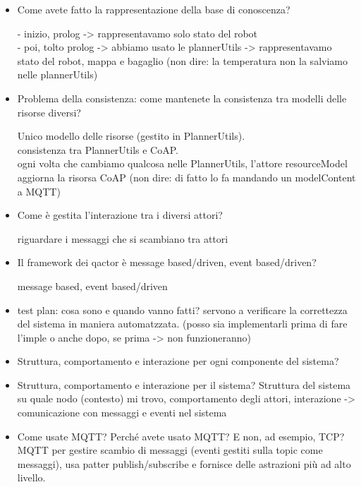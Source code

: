 \begin{itemize}
\item Come avete fatto la rappresentazione della base di  conoscenza?

- inizio, prolog -> rappresentavamo solo stato del robot \\
- poi, tolto prolog -> abbiamo usato le plannerUtils -> rappresentavamo stato del robot, mappa e bagaglio
(non dire: la temperatura non la salviamo nelle plannerUtils)

\item Problema della consistenza: come mantenete la consistenza tra modelli delle risorse diversi?


Unico modello delle risorse (gestito in PlannerUtils).\\

consistenza tra PlannerUtils e CoAP.\\

ogni volta che cambiamo qualcosa nelle PlannerUtils, l'attore resourceModel aggiorna la risorsa CoAP (non dire: di fatto lo fa mandando un modelContent a MQTT)\\

\item Come è gestita l’interazione tra i diversi attori? 

riguardare i messaggi che si scambiano tra attori 

\item Il framework dei qactor è message based/driven, event based/driven?

message based, event based/driven

\item test plan: cosa sono e quando vanno fatti?
servono a verificare la correttezza del sistema in maniera automatzzata.
(posso sia implementarli prima di fare l'imple o anche dopo, se prima -> non funzioneranno)

\item Struttura, comportamento e interazione per ogni componente del sistema?

\item Struttura, comportamento e interazione per il sistema?
Struttura del sistema su quale nodo (contesto) mi trovo,
comportamento degli attori, 
interazione -> comunicazione con messaggi e eventi nel sistema

\item Come usate MQTT? Perché avete usato MQTT? E non, ad esempio, TCP?
MQTT per gestire scambio di messaggi (eventi gestiti sulla topic come messaggi), usa patter publish/subscribe e fornisce delle astrazioni più ad alto livello. 


\end{itemize}
